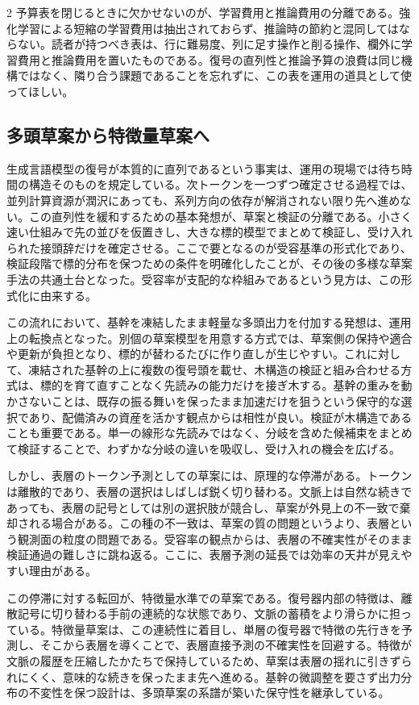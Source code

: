 \documentclass[lualatex,a4paper,10pt]{jlreq}
\begin{document}
\begin{multicols}{2}
予算表を閉じるときに欠かせないのが、学習費用と推論費用の分離である。強化学習による短縮の学習費用は抽出されておらず、推論時の節約と混同してはならない。読者が持つべき表は、行に難易度、列に足す操作と削る操作、欄外に学習費用と推論費用を置いたものである。復号の直列性と推論予算の浪費は同じ機構ではなく、隣り合う課題であることを忘れずに、この表を運用の道具として使ってほしい。

\subsection{多頭草案から特徴量草案へ}
生成言語模型の復号が本質的に直列であるという事実は、運用の現場では待ち時間の構造そのものを規定している。次トークンを一つずつ確定させる過程では、並列計算資源が潤沢にあっても、系列方向の依存が解消されない限り先へ進めない。この直列性を緩和するための基本発想が、草案と検証の分離である。小さく速い仕組みで先の並びを仮置きし、大きな標的模型でまとめて検証し、受け入れられた接頭辞だけを確定させる。ここで要となるのが受容基準の形式化であり、検証段階で標的分布を保つための条件を明確化したことが、その後の多様な草案手法の共通土台となった\autocite{chenspec}。受容率が支配的な枠組みであるという見方は、この形式化に由来する。

この流れにおいて、基幹を凍結したまま軽量な多頭出力を付加する発想は、運用上の転換点となった。別個の草案模型を用意する方式では、草案側の保持や適合や更新が負担となり、標的が替わるたびに作り直しが生じやすい。これに対して、凍結された基幹の上に複数の復号頭を載せ、木構造の検証と組み合わせる方式は、標的を育て直すことなく先読みの能力だけを接ぎ木する\autocite{medusa}。基幹の重みを動かさないことは、既存の振る舞いを保ったまま加速だけを狙うという保守的な選択であり、配備済みの資産を活かす観点からは相性が良い。検証が木構造であることも重要である。単一の線形な先読みではなく、分岐を含めた候補束をまとめて検証することで、わずかな分岐の違いを吸収し、受け入れの機会を広げる。

しかし、表層のトークン予測としての草案には、原理的な停滞がある。トークンは離散的であり、表層の選択はしばしば鋭く切り替わる。文脈上は自然な続きであっても、表層の記号としては別の選択肢が競合し、草案が外見上の不一致で棄却される場合がある。この種の不一致は、草案の質の問題というより、表層という観測面の粒度の問題である。受容率の観点からは、表層の不確実性がそのまま検証通過の難しさに跳ね返る。ここに、表層予測の延長では効率の天井が見えやすい理由がある。

この停滞に対する転回が、特徴量水準での草案である。復号器内部の特徴は、離散記号に切り替わる手前の連続的な状態であり、文脈の蓄積をより滑らかに担っている。特徴量草案は、この連続性に着目し、単層の復号器で特徴の先行きを予測し、そこから表層を導くことで、表層直接予測の不確実性を回避する\autocite{eagle}。特徴が文脈の履歴を圧縮したかたちで保持しているため、草案は表層の揺れに引きずられにくく、意味的な続きを保ったまま先へ進める。基幹の微調整を要さず出力分布の不変性を保つ設計は、多頭草案の系譜が築いた保守性を継承している。


\end{multicols}
\end{document}
